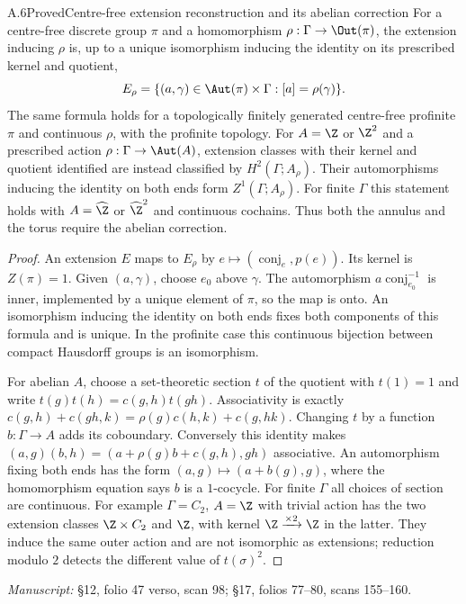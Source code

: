 \begin{claim}{A.6}{Proved}{Centre-free extension reconstruction and its abelian correction}
For a centre-free discrete group $\pi$ and a homomorphism $\rho:\Gamma\to\Out(\pi)$, the extension inducing $\rho$ is, up to a unique isomorphism inducing the identity on its prescribed kernel and quotient,
\[
 E_\rho=\{(a,\gamma)\in\Aut(\pi)\times\Gamma:[a]=\rho(\gamma)\}.
\]
The same formula holds for a topologically finitely generated centre-free profinite $\pi$ and continuous $\rho$, with the profinite topology. For $A=\Z$ or $\Z^2$ and a prescribed action $\rho:\Gamma\to\Aut(A)$, extension classes with their kernel and quotient identified are instead classified by $H^2(\Gamma;A_\rho)$. Their automorphisms inducing the identity on both ends form $Z^1(\Gamma;A_\rho)$. For finite $\Gamma$ this statement holds with $A=\widehat\Z$ or $\widehat\Z^2$ and continuous cochains. Thus both the annulus and the torus require the abelian correction.
\end{claim}
\begin{proof}
An extension $E$ maps to $E_\rho$ by $e\mapsto(\operatorname{conj}_e,p(e))$. Its kernel is $Z(\pi)=1$. Given $(a,\gamma)$, choose $e_0$ above $\gamma$. The automorphism $a\operatorname{conj}_{e_0}^{-1}$ is inner, implemented by a unique element of $\pi$, so the map is onto. An isomorphism inducing the identity on both ends fixes both components of this formula and is unique. In the profinite case this continuous bijection between compact Hausdorff groups is an isomorphism.

For abelian $A$, choose a set-theoretic section $t$ of the quotient with $t(1)=1$ and write $t(g)t(h)=c(g,h)t(gh)$. Associativity is exactly
$c(g,h)+c(gh,k)=\rho(g)c(h,k)+c(g,hk)$. Changing $t$ by a function $b:\Gamma\to A$ adds its coboundary. Conversely this identity makes $(a,g)(b,h)=(a+\rho(g)b+c(g,h),gh)$ associative. An automorphism fixing both ends has the form $(a,g)\mapsto(a+b(g),g)$, where the homomorphism equation says $b$ is a $1$-cocycle. For finite $\Gamma$ all choices of section are continuous. For example $\Gamma=C_2$, $A=\Z$ with trivial action has the two extension classes $\Z\times C_2$ and $\Z$, with kernel $\Z\xrightarrow{\times2}\Z$ in the latter. They induce the same outer action and are not isomorphic as extensions; reduction modulo $2$ detects the different value of $t(\sigma)^2$.
\end{proof}
\noindent\emph{Manuscript:} \S12, folio 47 verso, scan 98; \S17, folios 77--80, scans 155--160.

